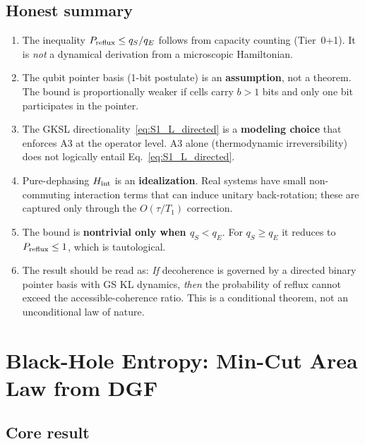 \documentclass[aps,prd,twocolumn,superscriptaddress,nofootinbib,floatfix]{revtex4-2}
\begin{document}
\subsection{Honest summary}

\begin{enumerate}
  \item The inequality $P_{\rm reflux}\le q_S/q_E$ follows from
    capacity counting (Tier~0+1).  It is \emph{not} a dynamical derivation
    from a microscopic Hamiltonian.
  \item The qubit pointer basis (1-bit postulate) is an \textbf{assumption},
    not a theorem.  The bound is proportionally weaker if cells carry $b>1$
    bits and only one bit participates in the pointer.
  \item The GKSL directionality~\eqref{eq:S1_L_directed} is a
    \textbf{modeling choice} that enforces A3 at the operator level.  A3
    alone (thermodynamic irreversibility) does not logically entail
    Eq.~\eqref{eq:S1_L_directed}.
  \item Pure-dephasing $H_{\rm int}$ is an \textbf{idealization}.  Real
    systems have small non-commuting interaction terms that can induce
    unitary back-rotation; these are captured only through the $O(\tau/T_1)$
    correction.
  \item The bound is \textbf{nontrivial only when $q_S<q_E$}.  For $q_S\ge q_E$
    it reduces to $P_{\rm reflux}\le 1$, which is tautological.
  \item The result should be read as: \emph{If} decoherence is governed by a
    directed binary pointer basis with GS KL dynamics, \emph{then} the
    probability of reflux cannot exceed the accessible-coherence ratio.
    This is a conditional theorem, not an unconditional law of nature.
\end{enumerate}

\section{Black-Hole Entropy: Min-Cut Area Law from DGF}
\label{sec:S4}

\subsection{Core result}
\end{document}

